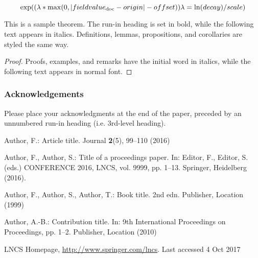 \documentclass[runningheads]{llncs}
\begin{document}
    \begin{equation}
        \exp ((\lambda * \max(0,| fieldvalue \textsubscript{doc} - origin | - offset)) \\
        \lambda = \ln(decay) / scale)  
    \end{equation}
    
    
\begin{theorem}
This is a sample theorem. The run-in heading is set in bold, while
the following text appears in italics. Definitions, lemmas,
propositions, and corollaries are styled the same way.
\end{theorem}
%
%
\begin{proof}
Proofs, examples, and remarks have the initial word in italics,
while the following text appears in normal font.
\end{proof}
\subsubsection{Acknowledgements} Please place your acknowledgments at
the end of the paper, preceded by an unnumbered run-in heading (i.e.
3rd-level heading).

%
%
%
% 
% 
%
\begin{thebibliography}{8}
Author, F.: Article title. Journal \textbf{2}(5), 99--110 (2016)

Author, F., Author, S.: Title of a proceedings paper. In: Editor,
F., Editor, S. (eds.) CONFERENCE 2016, LNCS, vol. 9999, pp. 1--13.
Springer, Heidelberg (2016). 

Author, F., Author, S., Author, T.: Book title. 2nd edn. Publisher,
Location (1999)

Author, A.-B.: Contribution title. In: 9th International Proceedings
on Proceedings, pp. 1--2. Publisher, Location (2010)

LNCS Homepage, \url{http://www.springer.com/lncs}. Last accessed 4
Oct 2017
\end{thebibliography}
\end{document}
